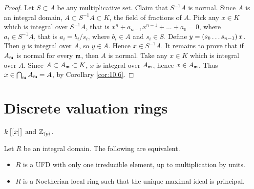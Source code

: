 \begin{proof}
Let $ S \subset A $ be any multiplicative set. Claim that $ S^{-1}A $ is normal. Since $ A $ is an integral domain, $ A \subset S^{-1}A \subset K $, the field of fractions of $ A $. Pick any $ x \in K $ which is integral over $ S^{-1}A $, that is $ x^n + a_{n - 1}x^{n - 1} + \dots + a_0 = 0 $, where $ a_i \in S^{-1}A $, that is $ a_i = b_i / s_i $, where $ b_i \in A $ and $ s_i \in S $. Define $ y = \br{s_0 \dots s_{n - 1}}x $. Then $ y $ is integral over $ A $, so $ y \in A $. Hence $ x \in S^{-1}A $. It remains to prove that if $ A_{\mathfrak{m}} $ is normal for every $ \mathfrak{m} $, then $ A $ is normal. Take any $ x \in K $ which is integral over $ A $. Since $ A \subset A_{\mathfrak{m}} \subset K $, $ x $ is integral over $ A_{\mathfrak{m}} $, hence $ x \in A_{\mathfrak{m}} $. Thus $ x \in \bigcap_{\mathfrak{m}} A_{\mathfrak{m}} = A $, by Corollary \ref{cor:10.6}.
\end{proof}

\pagebreak

\section{Discrete valuation rings}

\begin{example*}
$ k\sbr{\sbr{x}} $ and $ \mathbb{Z}_{\left\langle p \right\rangle} $.
\end{example*}

\begin{theorem}
\label{thm:15.1}
Let $ R $ be an integral domain. The following are equivalent.
\begin{itemize}
\item $ R $ is a UFD with only one irreducible element, up to multiplication by units.
\item $ R $ is a Noetherian local ring such that the unique maximal ideal is principal.
\end{itemize}
\end{theorem}

